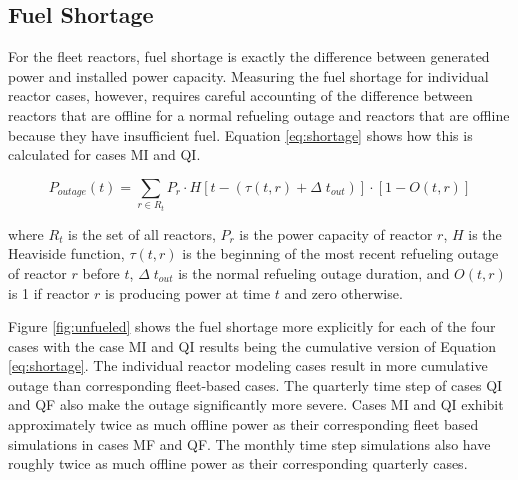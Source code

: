 \documentclass{style}
\begin{document}
\subsection{Fuel Shortage}

For the fleet reactors, fuel shortage is exactly the
difference between generated power and installed power capacity. Measuring the
fuel shortage for individual reactor cases, however, requires careful
accounting of the difference between reactors that are offline for a normal
refueling outage and reactors that are offline because they have insufficient
fuel. Equation \ref{eq:shortage} shows how this is calculated for cases MI and
QI.

\begin{equation}
    P_{outage}(t) = \sum\limits_{r \in R_t} P_r \cdot H[t-(\tau(t,r) + \Delta\;t_{out})] \cdot [1-O(t,r)]
    \label{eq:shortage}
\end{equation}

\noindent
where $R_t$ is the set of all reactors, $P_r$ is the power capacity of reactor
$r$, $H$ is the Heaviside function, $\tau(t,r)$ is the beginning of the most
recent refueling outage of reactor $r$ before $t$, $\Delta\; t_{out}$ is the
normal refueling outage duration, and $O(t,r)$ is 1 if reactor $r$ is
producing power at time $t$ and zero otherwise.

Figure \ref{fig:unfueled} shows the fuel shortage more explicitly for each of
the four cases with the case MI and QI results being the cumulative version of
Equation \ref{eq:shortage}.  The individual reactor modeling cases result in
more cumulative outage than corresponding fleet-based cases. The quarterly
time step of cases QI and QF also make the outage significantly more severe.
Cases MI and QI exhibit approximately twice as much offline power as their
corresponding fleet based simulations in cases MF and QF.  The monthly time
step simulations also have roughly twice as much offline power as their
corresponding quarterly cases.
\end{document}
